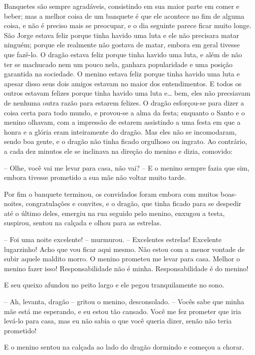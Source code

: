 Banquetes são sempre agradáveis, consistindo em sua maior parte em
comer e beber; mas a melhor coisa de um banquete é que ele acontece
no fim de alguma coisa, e não é preciso mais se preocupar, e o dia
seguinte parece ficar muito longe. São Jorge estava feliz porque
tinha havido uma luta e ele não precisara matar ninguém; porque ele
realmente não gostava de matar, embora em geral tivesse que fazê-lo.
O dragão estava feliz porque tinha havido uma luta, e além de não ter
se machucado nem um pouco nela, ganhara popularidade e uma posição
garantida na sociedade. O menino estava feliz porque tinha havido uma
luta e apesar disso seus dois amigos estavam no maior dos
entendimentos. E todos os outros estavam felizes porque tinha havido
uma luta e… bem, eles não precsiavam de nenhuma outra razão para
estarem felizes. O dragão esforçou-se para dizer a coisa certa para
todo mundo, e provou-se a alma da festa; enquanto o Santo e o menino
olhavam, com a impressão de estarem assistindo a uma festa em que a
honra e a glória eram inteiramente do dragão. Mas eles não se
incomodaram, sendo boa gente, e o dragão não tinha ficado orgulhoso
ou ingrato. Ao contrário, a cada dez minutos ele se inclinava na
direção do menino e dizia, comovido:

-- Olhe, você vai me levar para casa, não vai? -- E o menino sempre
fazia que sim, embora tivesse prometido a sua mãe não voltar muito
tarde.

Por fim o banquete terminou, os convidados foram embora com muitos
boas-noites, congratulações e convites, e o dragão, que tinha ficado
para se despedir até o último deles, emergiu na rua seguido pelo
menino, enxugou a testa, suspirou, sentou na calçada e olhou para as
estrelas.

-- Foi uma noite excelente! -- murmurou. -- Excelentes estrelas!
Excelente lugarzinho! Acho que vou ficar aqui mesmo. Não estou com a
menor vontade de subir aquele maldito morro. O menino prometeu me
levar para casa. Melhor o menino fazer isso! Responsabilidade não é
minha. Responsabilidade é do menino!

E seu queixo afundou no peito largo e ele pegou tranquilamente no
sono.

-- Ah, levanta, dragão -- gritou o menino, desconsolado. -- Vocês sabe
que minha mãe está me esperando, e eu estou tão cansado. Você me fez
prometer que iria levá-lo para casa, mas eu não sabia o que você
queria dizer, senão não teria prometido! 

E o menino sentou na calçada ao lado do dragão dormindo e começou a
chorar.

